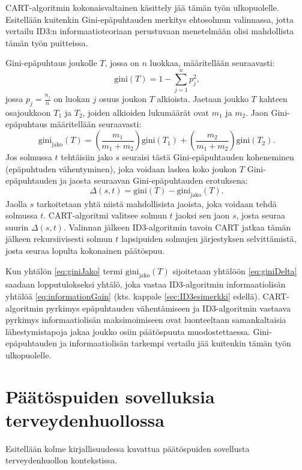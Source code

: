 \documentclass[12pt,finnish]{tktltiki2}
\theoremstyle{definition}
\theoremstyle{remark}
\begin{document}
CART-algoritmin kokonaisvaltainen käsittely jää tämän työn ulkopuolelle. Esitellään kuitenkin
Gini-epäpuhtauden merkitys ehtosolmun valinnassa, jotta vertailu ID3:n
informaatioteoriaan perustuvaan menetelmään olisi mahdollista tämän työn puitteissa.

Gini-epäpuhtaus joukolle $T$, jossa on $n$ luokkaa, määritellään seuraavasti:
\begin{equation*}
\textrm{gini}(T) = 1 -\sum_{j=1}^{n} p_j^2 \mbox{,}
\end{equation*}
jossa $p_j=\frac{n_j}{n}$ on luokan $j$ osuus joukon $T$ alkioista. Jaetaan joukko $T$ kahteen osajoukkoon
$T_1$ ja $T_2$, joiden alkioiden lukumäärät ovat $m_1$ ja $m_2$. Jaon Gini-epäpuhtaus määritellään seuraavasti:
\begin{equation}
\label{eq:giniJako}
\textrm{gini}_{\textrm{jako}}(T) = \left(\frac{m_1}{m_1+m_2}\right)\textrm{gini}(T_1) + \left(\frac{m_2}{m_1+m_2}\right)\textrm{gini}(T_2) \mbox{.}
\end{equation}
Jos solmussa $t$ tehtäisiin jako $s$ seuraisi tästä Gini-epäpuhtauden koheneminen (epäpuhtuden vähentyminen), joka voidaan
laskea koko joukon $T$ Gini-epäpuhtauden ja jaosta seuraavan Gini-epäpuhtauden erotuksena:
\begin{equation}
\label{eq:giniDelta}
\Delta(s,t) = \textrm{gini}(T) - \textrm{gini}_{\textrm{jako}}(T) \mbox{.}
\end{equation}
Jaolla $s$ tarkoitetaan yhtä niistä mahdollisista jaoista, joka voidaan tehdä solmussa $t$.
CART-algoritmi valitsee solmun $t$ jaoksi sen jaon $s$, josta seuraa suurin $\Delta(s,t)$.
Valinnan jälkeen ID3-algoritmin tavoin CART jatkaa tämän jälkeen rekursiivisesti solmun $t$
lapsipuiden solmujen järjestyksen selvittämistä, josta seuraa lopulta kokonainen päätöspuu.

Kun yhtälön \ref{eq:giniJako} termi ${\textrm{gini}_{\textrm{jako}}(T)}$ sijoitetaan yhtälöön \ref{eq:giniDelta}
saadaan lopputulokseksi yhtälö, joka vastaa ID3-algoritmin informaatiolisän yhtälöä \ref{eq:informationGain} (kts.
kappale \ref{sec:ID3esimerkki} edellä). CART-algoritmin pyrkimys epäpuhtauden vähentämiseen ja ID3-algoritmin
vastaava pyrkimys informaatiolisän maksimoimiseen ovat luonteeltaan samankaltaisia lähestymistapoja jakaa
joukko osiin päätöspuuta muodostettaessa. Gini-epäpuhtauden ja informaatiolisän tarkempi vertailu jää kuitenkin
tämän työn ulkopuolelle.


\section{Päätöspuiden sovelluksia terveydenhuollossa}
\label{sec:sovellukset_terveydenhuollossa}
Esitellään kolme kirjallisuudessa kuvattua päätöspuiden sovellusta terveydenhuollon kontekstissa.
\end{document}
